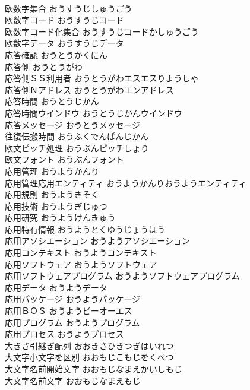 \documentclass[8pt]{extreport}
\begin{document}
\begin{CJK}{UTF8}{min}
\\	欧数字集合	おうすうじしゅうごう	
\\	欧数字コード	おうすうじコード	
\\	欧数字コード化集合	おうすうじコードかしゅうごう	
\\	欧数字データ	おうすうじデータ	
\\	応答確認	おうとうかくにん	
\\	応答側	おうとうがわ	
\\	応答側ＳＳ利用者	おうとうがわエスエスりようしゃ	
\\	応答側Ｎアドレス	おうとうがわエンアドレス	
\\	応答時間	おうとうじかん	
\\	応答時間ウインドウ	おうとうじかんウインドウ	
\\	応答メッセージ	おうとうメッセージ	
\\	往復伝搬時間	おうふくでんぱんじかん	
\\	欧文ピッチ処理	おうぶんピッチしょり	
\\	欧文フォント	おうぶんフォント	
\\	応用管理	おうようかんり	
\\	応用管理応用エンティティ	おうようかんりおうようエンティティ	
\\	応用規則	おうようきそく	
\\	応用技術	おうようぎじゅつ	
\\	応用研究	おうようけんきゅう	
\\	応用特有情報	おうようとくゆうじょうほう	
\\	応用アソシエーション	おうようアソシエーション	
\\	応用コンテキスト	おうようコンテキスト	
\\	応用ソフトウェア	おうようソフトウェア	
\\	応用ソフトウェアプログラム	おうようソフトウェアプログラム	
\\	応用データ	おうようデータ	
\\	応用パッケージ	おうようパッケージ	
\\	応用ＢＯＳ	おうようビーオーエス	
\\	応用プログラム	おうようプログラム	
\\	応用プロセス	おうようプロセス	
\\	大きさ引継ぎ配列	おおきさひきつぎはいれつ	
\\	大文字小文字を区別	おおもじこもじをくべつ	
\\	大文字名前開始文字	おおもじなまえかいしもじ	
\\	大文字名前文字	おおもじなまえもじ	

\end{CJK}
\end{document}
